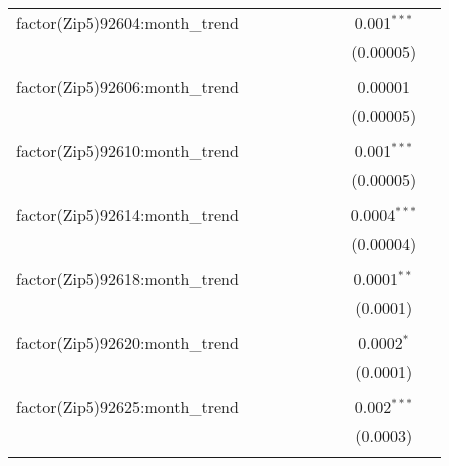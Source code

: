 \begin{table}[H]
{\begin{tabular}{@{\extracolsep{5pt}}lcccccccc}
  factor(Zip5)92604:month\_trend &  &  &  &  &  &  & 0.001$^{***}$ &  \\  

   &  &  &  &  &  &  & (0.00005) &  \\  

   & & & & & & & & \\  

  factor(Zip5)92606:month\_trend &  &  &  &  &  &  & 0.00001 &  \\  

   &  &  &  &  &  &  & (0.00005) &  \\  

   & & & & & & & & \\  

  factor(Zip5)92610:month\_trend &  &  &  &  &  &  & 0.001$^{***}$ &  \\  

   &  &  &  &  &  &  & (0.00005) &  \\  

   & & & & & & & & \\  

  factor(Zip5)92614:month\_trend &  &  &  &  &  &  & 0.0004$^{***}$ &  \\  

   &  &  &  &  &  &  & (0.00004) &  \\  

   & & & & & & & & \\  

  factor(Zip5)92618:month\_trend &  &  &  &  &  &  & 0.0001$^{**}$ &  \\  

   &  &  &  &  &  &  & (0.0001) &  \\  

   & & & & & & & & \\  

  factor(Zip5)92620:month\_trend &  &  &  &  &  &  & 0.0002$^{*}$ &  \\  

   &  &  &  &  &  &  & (0.0001) &  \\  

   & & & & & & & & \\  

  factor(Zip5)92625:month\_trend &  &  &  &  &  &  & 0.002$^{***}$ &  \\  

   &  &  &  &  &  &  & (0.0003) &  \\  

   & & & & & & & & \\  


\end{tabular}}
\end{table}
